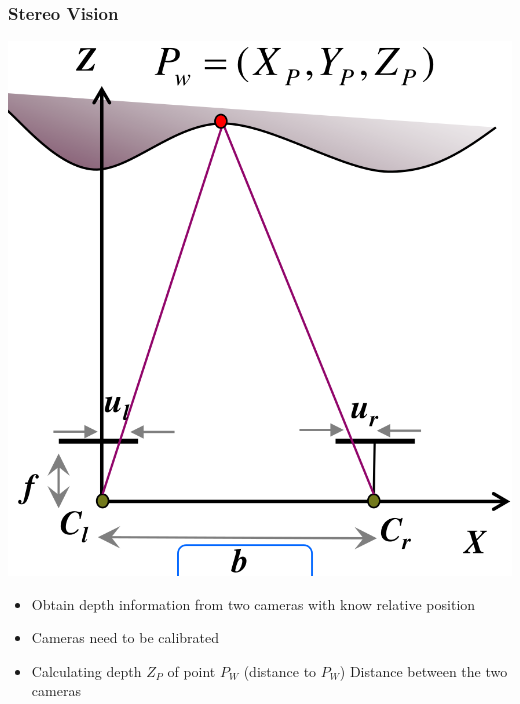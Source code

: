 \subsubsection{Stereo Vision}
\begin{minipage}[b]{0.49\linewidth}
    \includegraphics[width=\linewidth]{./Figures/04_StereoVision.png}
\end{minipage}
\begin{minipage}[b]{0.49\linewidth}
    \raggedright
    \begin{itemize}
        \item Obtain depth information from two cameras with know relative position
        \item Cameras need to be calibrated
        \item Calculating depth $Z_P$ of point $P_W$ (distance to $P_W$)
         Distance between the two cameras
    \end{itemize}
\end{minipage}

